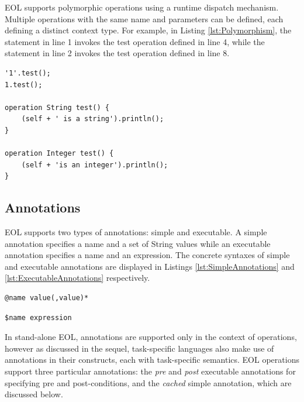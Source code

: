 EOL supports polymorphic operations using a runtime dispatch mechanism. Multiple operations with the same name and parameters can be defined, each defining a distinct context type. For example, in Listing \ref{lst:Polymorphism}, the statement in line 1 invokes the test operation defined in line 4, while the statement in line 2 invokes the test operation defined in line 8.

\begin{lstlisting}[basicstyle=\ttfamily\footnotesize, flexiblecolumns=true, numbers=none, nolol=true, caption=Demonstration of polymorphism in EOL, label=lst:Polymorphism, numbers=left, language=EOL, tabsize=2]
'1'.test();
1.test();

operation String test() {
	(self + ' is a string').println();
}

operation Integer test() {
	(self + 'is an integer').println();
}

\end{lstlisting}

\subsection{Annotations}
\label{sec:Design.EOL.Annotations}
EOL supports two types of annotations: simple and executable. A simple annotation specifies a name and a set of String values while an executable annotation specifies a name and an expression. The concrete syntaxes of simple and executable annotations are displayed in Listings \ref{lst:SimpleAnnotations} and \ref{lst:ExecutableAnnotations} respectively.

\begin{lstlisting}[basicstyle=\ttfamily\footnotesize, flexiblecolumns=true, numbers=none, nolol=true, caption=Concrete syntax of simple annotations, label=lst:SimpleAnnotations, language=EOL, tabsize=2]
@name value(,value)*
\end{lstlisting}

\begin{lstlisting}[basicstyle=\ttfamily\footnotesize, flexiblecolumns=true, numbers=none, nolol=true, caption=Concrete syntax of executable annotations, label=lst:ExecutableAnnotations, language=EOL, tabsize=2]
$name expression
\end{lstlisting}

In stand-alone EOL, annotations are supported only in the context of operations, however as discussed in the sequel, task-specific languages also make use of annotations in their constructs, each with task-specific semantics. EOL operations support three particular annotations: the \emph{pre} and \emph{post} executable annotations for specifying pre and post-conditions, and the \emph{cached} simple annotation, which are discussed below.

